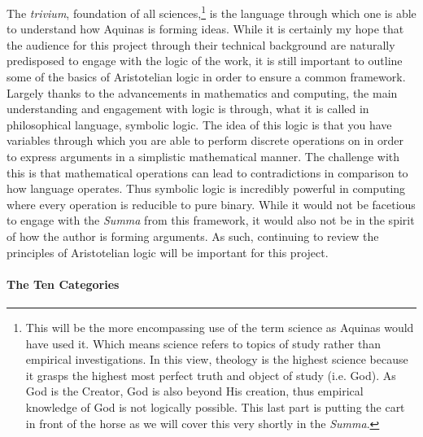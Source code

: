 \documentclass{ucetd}
\begin{document}
The \textit{trivium}, foundation of all sciences,\footnote{This will be the more encompassing use of the term science as Aquinas would have used it. Which means science refers to topics of study rather than empirical investigations. In this view, theology is the highest science because it grasps the highest most perfect truth and object of study (i.e. God). As God is the Creator, God is also beyond His creation, thus empirical knowledge of God is not logically possible. This last part is putting the cart in front of the horse as we will cover this very shortly in the \textit{Summa}.
} is the language through which one is able to understand how Aquinas is forming ideas. While it is certainly my hope that the audience for this project through their technical background are naturally predisposed to engage with the logic of the work, it is still important to outline some of the basics of Aristotelian logic in order to ensure a common framework. Largely thanks to the advancements in mathematics and computing, the main understanding and engagement with logic is through, what it is called in philosophical language, symbolic logic. The idea of this logic is that you have variables through which you are able to perform discrete operations on in order to express arguments in a simplistic mathematical manner. The challenge with this is that mathematical operations can lead to contradictions in comparison to how language operates. Thus symbolic logic is incredibly powerful in computing where every operation is reducible to pure binary. While it would not be facetious to engage with the \textit{Summa} from this framework, it would also not be in the spirit of how the author is forming arguments. As such, continuing to review the principles of Aristotelian logic will be important for this project.
\paragraph{The Ten Categories}
\end{document}
